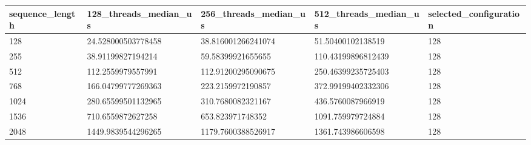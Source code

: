 \begin{tabular}{lllll}
\hline
sequence\_length & 128\_threads\_median\_us & 256\_threads\_median\_us & 512\_threads\_median\_us & selected\_configuration \\
\hline
128 & 24.528000503778458 & 38.816001266241074 & 51.50400102138519 & 128 \\
255 & 38.91199827194214 & 59.58399921655655 & 110.43199896812439 & 128 \\
512 & 112.2559979557991 & 112.91200295090675 & 250.46399235725403 & 128 \\
768 & 166.04799777269363 & 223.2159972190857 & 372.99199402332306 & 128 \\
1024 & 280.65599501132965 & 310.7680082321167 & 436.5760087966919 & 128 \\
1536 & 710.6559872627258 & 653.823971748352 & 1091.759979724884 & 128 \\
2048 & 1449.9839544296265 & 1179.7600388526917 & 1361.743986606598 & 128 \\
\hline
\end{tabular}
